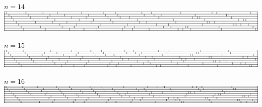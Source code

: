 $n = 14$\\
\includegraphics[width=\textwidth]{../solutions/14}
\par\vspace{1em}
$n = 15$\\
\includegraphics[width=\textwidth]{../solutions/15}
\par\vspace{1em}
$n = 16$\\
\includegraphics[width=\textwidth]{../solutions/16}
\par\vspace{1em}